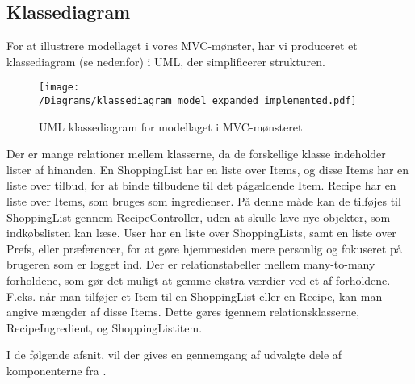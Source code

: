 \subsection{Klassediagram}
For at illustrere modellaget i vores MVC-mønster, har vi produceret et klassediagram (se  nedenfor) i UML, der simplificerer strukturen.

\begin{figure}[H]
\centering
\texttt{[image: /Diagrams/klassediagram\_model\_expanded\_implemented.pdf]}
\caption{UML klassediagram for modellaget i MVC-mønsteret}\label{diagram:klassediagram}
\end{figure}

Der er mange relationer mellem klasserne, da de forskellige klasse indeholder lister af hinanden.
En ShoppingList har en liste over Items, og disse Items har en liste over tilbud, for at binde tilbudene til det pågældende Item.
Recipe har en liste over Items, som bruges som ingredienser.
På denne måde kan de tilføjes til ShoppingList gennem RecipeController, uden at skulle lave nye objekter, som indkøbslisten kan læse.
User har en liste over ShoppingLists, samt en liste over Prefs, eller præferencer, for at gøre hjemmesiden mere personlig og fokuseret på brugeren som er logget ind.
Der er relationstabeller mellem many-to-many forholdene, som gør det muligt at gemme ekstra værdier ved et af forholdene.
F.eks. når man tilføjer et Item til en ShoppingList eller en Recipe, kan man angive mængder af disse Items.
Dette gøres igennem relationsklasserne, Recipe\textunderscore Ingredient, og ShoppingList\textunderscore item.

I de følgende afsnit, vil der gives en gennemgang af udvalgte dele af komponenterne fra .
